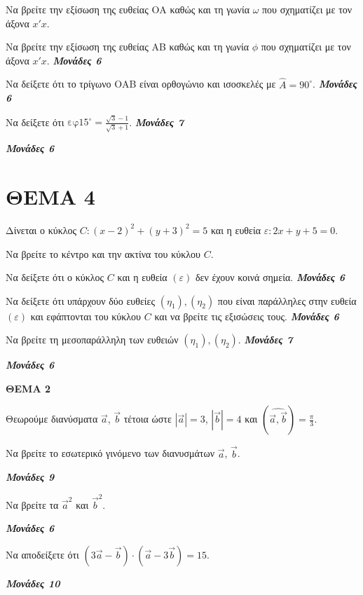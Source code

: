 \documentclass[11pt,a4paper,twoside]{book}
\newcommand{\Askhseis}[1]{{\urwgothic\bfseries\fontsize{16}{19}\selectfont #1}}
\newcommand{\monades}[1]{
\hspace*{\fill}
\textbf{\textit{\textcolor{maincolor}{Μονάδες #1}}}}
\begin{document}
\begin{alist}    \item Να βρείτε την εξίσωση της ευθείας ΟΑ καθώς και τη γωνία $\omega$ που σχηματίζει με τον άξονα $x'x$.
    \item Να βρείτε την εξίσωση της ευθείας ΑΒ καθώς και τη γωνία $\phi$ που σχηματίζει με τον άξονα $x'x$.  \monades{6}
    \item Να δείξετε ότι το τρίγωνο ΟΑΒ είναι ορθογώνιο και ισοσκελές με $\hat{A} = 90^\circ$.  \monades{6}
    \item Να δείξετε ότι $\text{εφ}15^\circ = \frac{\sqrt{3}-1}{\sqrt{3}+1}$.  \monades{7}
 \monades{6}\end{alist}

\vspace{4mm}

\section*{ΘΕΜΑ 4}

Δίνεται ο κύκλος $C: (x-2)^2+(y+3)^2 = 5$ και η ευθεία $\varepsilon: 2x+y+5=0$.

\begin{alist}    \item Να βρείτε το κέντρο και την ακτίνα του κύκλου $C$.
    \item Να δείξετε ότι ο κύκλος $C$ και η ευθεία $(\varepsilon)$ δεν έχουν κοινά σημεία.  \monades{6}
    \item Να δείξετε ότι υπάρχουν δύο ευθείες $(\eta_1),(\eta_2)$ που είναι παράλληλες στην ευθεία $(\varepsilon)$ και εφάπτονται του κύκλου $C$ και να βρείτε τις εξισώσεις τους.  \monades{6}
    \item Να βρείτε τη μεσοπαράλληλη των ευθειών $(\eta_1),(\eta_2)$.  \monades{7}
 \monades{6}\end{alist}

\vspace{4mm}

\Askhseis{ΘΕΜΑ 2}

Θεωρούμε διανύσματα $\vec{a}$, $\vec{b}$ τέτοια ώστε $|\vec{a}| = 3$, $|\vec{b}| = 4$ και $\left(\widehat{\vec{a}, \vec{b}}\right) = \frac{\pi}{3}$.

\begin{alist}    \item Να βρείτε το εσωτερικό γινόμενο των διανυσμάτων $\vec{a}$, $\vec{b}$. \par\monades{9}
    \item Να βρείτε τα $\vec{a}^2$ και $\vec{b}^2$. \par\monades{6}
    \item Να αποδείξετε ότι $(3\vec{a} - \vec{b}) \cdot (\vec{a} - 3\vec{b}) = 15$. \par\monades{10}\end{alist}
\end{document}
